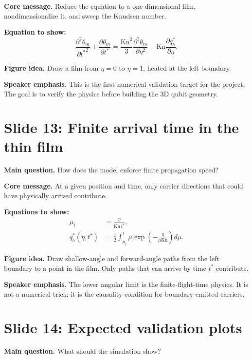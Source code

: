 \documentclass[11pt]{article}
\begin{document}
\textbf{Core message.} Reduce the equation to a one-dimensional film, nondimensionalize it, and sweep the Knudsen number.

\textbf{Equation to show:}
\begin{equation*}
\frac{\partial^2\theta_m}{\partial {t^*}^2}
+\frac{\partial\theta_m}{\partial t^*}
=\frac{\mathrm{Kn}^2}{3}\frac{\partial^2\theta_m}{\partial\eta^2}
-\mathrm{Kn}\frac{\partial q_b^*}{\partial\eta}.
\end{equation*}

\textbf{Figure idea.} Draw a film from \(\eta=0\) to \(\eta=1\), heated at the left boundary.

\textbf{Speaker emphasis.} This is the first numerical validation target for the project. The goal is to verify the physics before building the 3D qubit geometry.

\section{Slide 13: Finite arrival time in the thin film}
\begin{physicsbox}
\textbf{Main question.} How does the model enforce finite propagation speed?
\end{physicsbox}

\textbf{Core message.} At a given position and time, only carrier directions that could have physically arrived contribute.

\textbf{Equations to show:}
\begin{align*}
\mu_t &= \frac{\eta}{\mathrm{Kn}\,t^*},\\
q_b^*(\eta,t^*)&=\frac{1}{2}\int_{\mu_t}^{1}\mu\exp\left(-\frac{\eta}{\mu\mathrm{Kn}}\right)d\mu.
\end{align*}

\textbf{Figure idea.} Draw shallow-angle and forward-angle paths from the left boundary to a point in the film. Only paths that can arrive by time \(t^*\) contribute.

\textbf{Speaker emphasis.} The lower angular limit is the finite-flight-time physics. It is not a numerical trick; it is the causality condition for boundary-emitted carriers.

\section{Slide 14: Expected validation plots}
\begin{physicsbox}
\textbf{Main question.} What should the simulation show?
\end{physicsbox}
\end{document}
